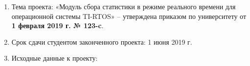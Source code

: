     \begin{enumerate}[label=\textbf{\arabic*}, itemsep=1em,
      leftmargin=*,
      itemindent=\taskLiskSectionItemLeftIndent-\taskLiskSubsectionDelta]
      \item Тема проекта: «Модуль сбора статистики в режиме реального времени для операционной системы TI-RTOS» -- утверждена приказом по университету от
      \textbf{1 февраля 2019 г. № 123-c}.
      \item Срок сдачи студентом законченного проекта: 1 июня 2019 г.
      \item Исходные данные к проекту:


\end{enumerate}
